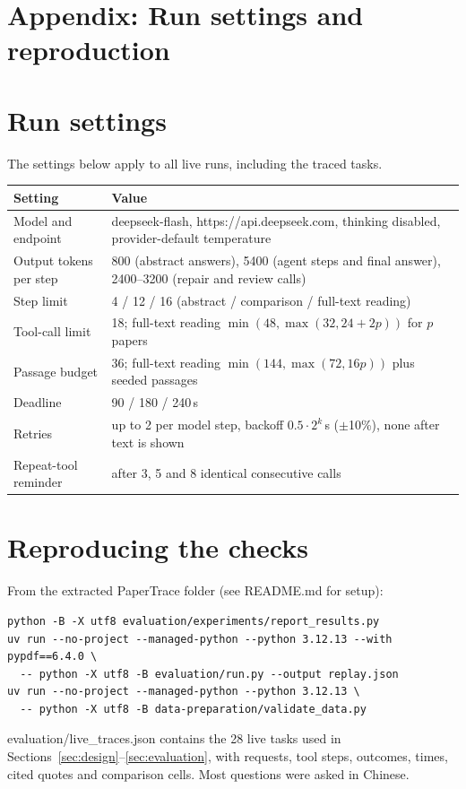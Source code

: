 \documentclass{article}
\newcommand{\code}[1]{{\ttfamily\small\hyphenchar\font=-1\relax #1}}
\begin{document}
\clearpage
\appendix
\section*{Appendix: Run settings and reproduction}

\section{Run settings}
The settings below apply to all live runs, including the traced tasks.

\medskip
{\small
  \begin{tabularx}{\linewidth}{@{}P{3.2cm}Y@{}}
    \toprule
    Setting & Value \\
    \midrule
    Model and endpoint & \code{deepseek-flash}, \code{https://api.deepseek.com}, thinking disabled, provider-default temperature \\
    Output tokens per step & 800 (abstract answers), 5400 (agent steps and final answer), 2400--3200 (repair and review calls) \\
    Step limit & 4 / 12 / 16 (abstract / comparison / full-text reading) \\
    Tool-call limit & 18; full-text reading $\min(48, \max(32, 24 + 2p))$ for $p$ papers \\
    Passage budget & 36; full-text reading $\min(144, \max(72, 16p))$ plus seeded passages \\
    Deadline & 90 / 180 / 240\,s \\
    Retries & up to 2 per model step, backoff $0.5 \cdot 2^{k}$\,s ($\pm$10\%), none after text is shown \\
    Repeat-tool reminder & after 3, 5 and 8 identical consecutive calls \\
    \bottomrule
  \end{tabularx}
}

\section{Reproducing the checks}
From the extracted \code{PaperTrace} folder (see \code{README.md} for setup):
\begin{verbatim}
python -B -X utf8 evaluation/experiments/report_results.py
uv run --no-project --managed-python --python 3.12.13 --with pypdf==6.4.0 \
  -- python -X utf8 -B evaluation/run.py --output replay.json
uv run --no-project --managed-python --python 3.12.13 \
  -- python -X utf8 -B data-preparation/validate_data.py
\end{verbatim}
\code{evaluation/live\_traces.json} contains the 28 live tasks used in Sections~\ref{sec:design}--\ref{sec:evaluation},
with requests, tool steps, outcomes, times, cited quotes and comparison cells. Most questions were
asked in Chinese.
\end{document}
